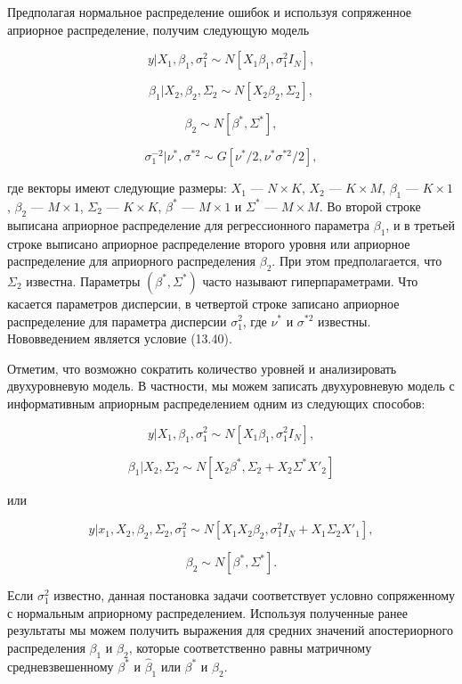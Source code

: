Предполагая нормальное распределение ошибок и используя сопряженное априорное распределение, получим следующую модель

\begin{equation}
y|X_{1},\beta_1,\sigma^{2}_1 \sim N[X_{1}\beta_1,\sigma^2_{1}I_N],
\end{equation}

\begin{equation}
\beta_1|X_2,\beta_2,\Sigma_2 \sim N[X_2\beta_2,\Sigma_2],
\end{equation}

\begin{equation}
\beta_2 \sim N[\beta^{*},\Sigma^{*}],
\end{equation}

\begin{equation}
\sigma^{-2}_1|\nu^{*},\sigma^{*2} \sim G[\nu^{*}/2,\nu^{*}\sigma^{*2}/2],
\end{equation}

где векторы имеют следующие размеры: $X_1$ --- $N{\times}K$, $X_2$ --- $K\times M$, $\beta_1$ --- $K{\times}1$, $\beta_2$ --- $M{\times}1$, $\Sigma_2$ --- $K{\times}K$, $\beta^{*}$ --- $M{\times}1$ и $\Sigma^{*}$ --- $M{\times}M$. Во второй строке выписана априорное распределение для  регрессионного параметра $\beta_1$, и в третьей строке выписано априорное распределение второго уровня или априорное распределение для априорного распределения $\beta_2$. При этом предполагается, что $\Sigma_2$ известна. Параметры $(\beta^*,\Sigma^*)$ часто называют гиперпараметрами. Что касается параметров дисперсии, в четвертой строке записано априорное распределение для параметра дисперсии $\sigma^2_1$, где $\nu^{*}$ и $\sigma^{*2}$ известны. Нововведением является условие (13.40).

Отметим, что возможно сократить количество уровней и анализировать двухуровневую модель. В частности, мы можем записать двухуровневую модель с информативным априорным распределением одним из следующих способов:

\[
y|X_1,\beta_1,\sigma^2_1{\sim}N[X_1\beta_1,\sigma^2_1I_N],
\]

\[
\beta_1|X_2,\Sigma_2{\sim}N[X_2\beta^*,\Sigma_2+X_2\Sigma^{*}X'_2]
\]

или

\[
y|x_1,X_2,\beta_2,\Sigma_2,\sigma^2_1{\sim}N[X_1X_2\beta_2,\sigma^2_1I_N+X_1\Sigma_2X'_1],
\]

\[
\beta_2{\sim}N[\beta^*,\Sigma^*].
\]

Если $\sigma^2_1$ известно, данная постановка задачи соответствует условно сопряженному с нормальным априорному распределением. Используя полученные ранее результаты мы можем получить  выражения для средних значений апостериорного распределения $\beta_1$ и $\beta_2$, которые соответственно равны матричному средневзвешенному  $\beta^*$ и $\hat{\beta}_1$ или $\beta^*$ и $\hat{\beta}_2$.

